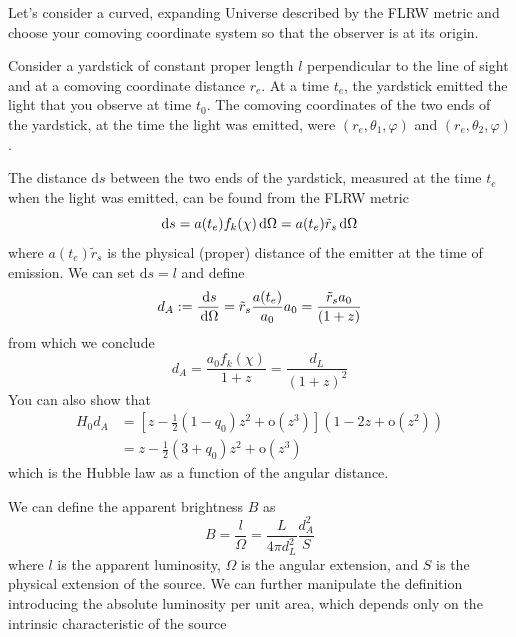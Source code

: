 \par Let's consider a curved, expanding Universe described by the FLRW metric and choose your comoving coordinate system so that the observer is at its origin.
\par Consider a yardstick of constant proper length $l$ perpendicular to the line of sight and at a comoving coordinate distance $r_{e}$. At a time $t_{e}$, the yardstick emitted the light that you observe at time $t_{0}$. The comoving coordinates of the two ends of the yardstick, at the time the light was emitted, were $(r_{e},\theta_{1},\varphi)$ and
$(r_{e},\theta_{2},\varphi)$.
\par The distance $\text{d}s$ between the two ends of the yardstick, measured at the time $t_{e}$ when the light was emitted, can be found from the FLRW metric
\begin{equation*}
    \text{d}s = a(t_{e})f_{k}(\chi)\,\text{d}\Omega = a(t_{e})\tilde{r}_{s}\,\text{d}\Omega
\end{equation*}
where $a(t_{e})\tilde{r}_{s}$ is the physical (proper) distance of the emitter at the time of emission. We can set $\text{d}s = l$ and define
\begin{equation}
    d_{A} := \frac{\,\text{d}s}{\,\text{d}\Omega} = \tilde{r}_{s}\frac{a(t_{e})}{a_{0}}a_{0} = \frac{\tilde{r}_{s}a_{0}}{(1+z)}
\end{equation}
from which we conclude
\begin{equation}
    d_{A} = \frac{a_{0}f_{k}(\chi)}{1+z} = \frac{d_{L}}{(1+z)^{2}}
    \label{eq:angulardistance}
\end{equation}
You can also show that 
\begin{align*}
    H_{0}d_{A} &= \left[z-\frac{1}{2}(1-q_{0})z^{2}+\text{o}(z^{3})\right](1-2z+\text{o}(z^{2}))\\
    &= z-\frac{1}{2}(3+q_{0})z^{2}+\text{o}(z^{3})
\end{align*}
which is the Hubble law as a function of the angular distance.
\par We can define the apparent brightness $B$ as 
\begin{equation}
    B = \frac{l}{\Omega} = \frac{L}{4\pi d_{L}^{2}}\frac{d_{A}^{2}}{S}
    \label{eq:apparentbrightness}
\end{equation}
where $l$ is the apparent luminosity, $\Omega$ is the angular extension, and $S$ is the physical extension of the source. We can further manipulate the definition introducing the absolute luminosity per unit area, which depends only on the intrinsic characteristic of the source 
